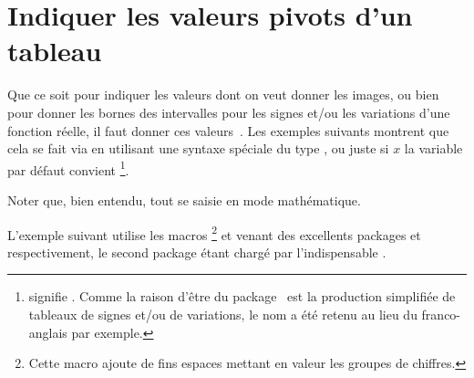 \documentclass[10pt, a4paper]{article}
\begin{document}
\section{Indiquer les valeurs pivots d'un tableau}

Que ce soit pour indiquer les valeurs dont on veut donner les images, ou bien pour donner les bornes des intervalles pour les signes et/ou les variations d'une fonction réelle, il faut donner ces valeurs \,. Les exemples suivants montrent que cela se fait via  en utilisant une syntaxe spéciale du type 
 ,
ou juste 
 
si $x$ la variable par défaut convient
\footnote{
	 signifie .
	Comme la raison d'être du package \thispack\ est la production simplifiée de tableaux de signes et/ou de variations, le nom  a été retenu au lieu du franco-anglais  par exemple.
}.




\begin{tdocexa}
    Noter que, bien entendu, tout se saisie en mode mathématique.

\end{tdocexa}




\begin{tdocexa}
    \leavevmode

\end{tdocexa}



\begin{tdocexa}
    L'exemple suivant utilise les macros 
    \footnote{
    	Cette macro ajoute de fins espaces mettant en valeur les groupes de chiffres.
    }
    et  venant des excellents packages  et  respectivement, le second package étant chargé par l'indispensable .

\end{tdocexa}


\end{document}
